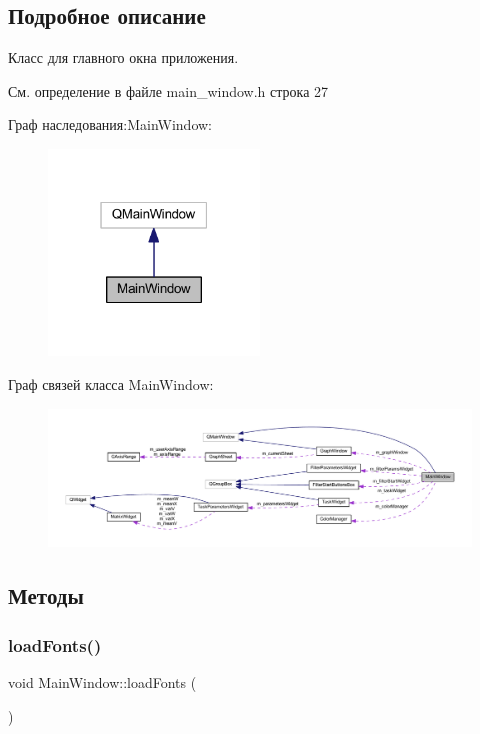 \subsection{Подробное описание}
Класс для главного окна приложения. 

См. определение в файле main\+\_\+window.\+h строка 27



Граф наследования\+:Main\+Window\+:
\nopagebreak
\begin{figure}[H]
\begin{center}
\leavevmode
\includegraphics[width=159pt]{class_main_window__inherit__graph}
\end{center}
\end{figure}


Граф связей класса Main\+Window\+:
\nopagebreak
\begin{figure}[H]
\begin{center}
\leavevmode
\includegraphics[width=350pt]{class_main_window__coll__graph}
\end{center}
\end{figure}


\subsection{Методы}
\hypertarget{class_main_window_af0898886d5a3e9c0b336312e959daae6}{}\label{class_main_window_af0898886d5a3e9c0b336312e959daae6} 
\subsubsection{\texorpdfstring{load\+Fonts()}{loadFonts()}}
{\footnotesize\ttfamily void Main\+Window\+::load\+Fonts (\begin{DoxyParamCaption}{ }\end{DoxyParamCaption})\hspace{0.3cm}{\ttfamily [private]}}



